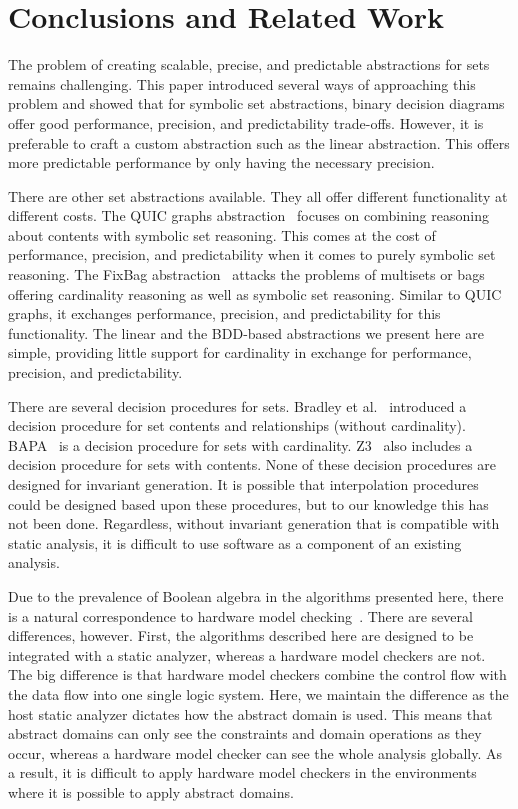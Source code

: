 \section{Conclusions and Related Work}
The problem of creating scalable, precise, and predictable abstractions for sets remains challenging.  This paper introduced several ways of approaching this problem and showed that for symbolic set abstractions, binary decision diagrams offer good performance, precision, and predictability trade-offs.  However, it is preferable to craft a custom abstraction such as the linear abstraction.  This offers more predictable performance by only having the necessary precision.

There are other set abstractions available.  They all offer different functionality at different costs.  The QUIC graphs abstraction~\cite{ab:ecoop:13,quicr:cav:14} focuses on combining reasoning about contents with symbolic set reasoning.  This comes at the cost of performance, precision, and predictability when it comes to purely symbolic set reasoning.  The FixBag abstraction~\cite{fixbag:cav:11} attacks the problems of multisets or bags offering cardinality reasoning as well as symbolic set reasoning.  Similar to QUIC graphs, it exchanges performance, precision, and predictability for this functionality.  The linear and the BDD-based abstractions we present here are simple, providing little support for cardinality in exchange for performance, precision, and predictability.

There are several decision procedures for sets.  Bradley et al.~\cite{bradley:vmcai:06} introduced a decision procedure for set contents and relationships (without cardinality).  BAPA~\cite{knr:jar:06,jahob:thesis:07} is a decision procedure for sets with cardinality.  Z3~\cite{mb:tacas:08} also includes a decision procedure for sets with contents.  None of these decision procedures are designed for invariant generation.  It is possible that interpolation procedures~\cite{interp:cav:03} could be designed based upon these procedures, but to our knowledge this has not been done.  Regardless, without invariant generation that is compatible with static analysis, it is difficult to use software as a component of an existing analysis.

Due to the prevalence of Boolean algebra in the algorithms presented here, there is a natural correspondence to hardware model checking~\cite{mc:toplas:86}.  There are several differences, however.  First, the algorithms described here are designed to be integrated with a static analyzer, whereas a hardware model checkers are not.  The big difference is that hardware model checkers combine the control flow with the data flow into one single logic system.  Here, we maintain the difference as the host static analyzer dictates how the abstract domain is used.  This means that abstract domains can only see the constraints and domain operations as they occur, whereas a hardware model checker can see the whole analysis globally.  As a result, it is difficult to apply hardware model checkers in the environments where it is possible to apply abstract domains.

